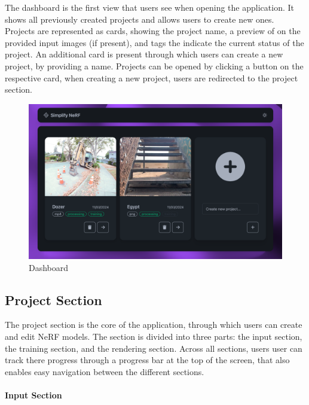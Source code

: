 The dashboard is the first view that users see when opening the application. It shows all previously created projects and allows users to create new ones. 
Projects are represented as cards, showing the project name, a preview of on the provided input images (if present), and tags the indicate the current status of the project.
An additional card is present through which users can create a new project, by providing a name.
Projects can be opened by clicking a button on the respective card, when creating a new project, users are redirected to the project section.

\begin{figure}[htb]
  \includegraphics[width=\textwidth]{figures/view-overview.png}
  \caption{Dashboard}
  \label{fig:design:dashboard}
\end{figure}

\subsection*{Project Section}

The project section is the core of the application, through which users can create and edit NeRF models.
The section is divided into three parts: the input section, the training section, and the rendering section.
Across all sections, users user can track there progress through a progress bar at the top of the screen, that also enables easy navigation between the different sections.

\paragraph{Input Section}

